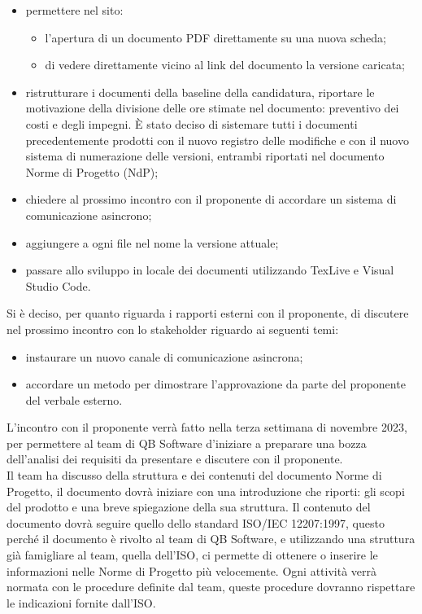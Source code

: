 \documentclass[12pt]{article}
\begin{document}
		\begin{itemize}
			\item permettere nel sito:
			\begin{itemize}
				\item l'apertura di un documento PDF direttamente su una nuova scheda;
				\item di vedere direttamente vicino al link del documento la versione caricata;
			\end{itemize}
			\item ristrutturare i documenti della baseline della candidatura, riportare le motivazione della divisione delle ore stimate nel documento: preventivo dei costi e degli impegni. È stato deciso di sistemare tutti i documenti precedentemente prodotti con il nuovo registro delle modifiche e con il nuovo sistema di numerazione delle versioni, entrambi riportati nel documento Norme di Progetto (NdP);
			\item chiedere al prossimo incontro con il proponente di accordare un sistema di comunicazione asincrono;
			\item aggiungere a ogni file nel nome la versione attuale;
			\item passare allo sviluppo in locale dei documenti utilizzando TexLive e Visual Studio Code.
		\end{itemize}
		\noindent
		Si è deciso, per quanto riguarda i rapporti esterni con il proponente, di discutere nel prossimo incontro con lo stakeholder riguardo ai seguenti temi:
		\begin{itemize}
			\item instaurare un nuovo canale di comunicazione asincrona;
			\item accordare un metodo per dimostrare l'approvazione da parte del proponente del verbale esterno.
		\end{itemize}
		\noindent L'incontro con il proponente verrà fatto nella terza settimana di novembre 2023, per permettere al team di QB Software d'iniziare a preparare una bozza dell'analisi dei requisiti da presentare e discutere con il proponente.
		\\\noindent
		Il team ha discusso della struttura e dei contenuti del documento Norme di Progetto, il documento dovrà iniziare con una introduzione che riporti: gli scopi del prodotto e una breve spiegazione della sua struttura. Il contenuto del documento dovrà seguire quello dello standard ISO/IEC 12207:1997, questo perché il documento è rivolto al team di QB Software, e utilizzando una struttura già famigliare al team, quella dell'ISO, ci permette di ottenere o inserire le informazioni nelle Norme di Progetto più velocemente.
		Ogni attività verrà normata con le procedure definite dal team, queste procedure dovranno rispettare le indicazioni fornite dall'ISO.
		
\end{document}

